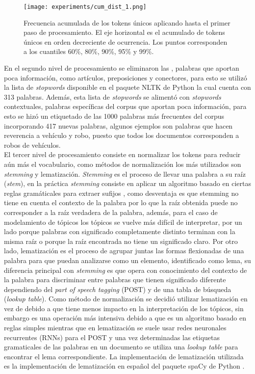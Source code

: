 \documentclass[letterpaper,12pt,oneside]{book} %
\begin{document}
\begin{figure}
    \centering
    \texttt{[image: experiments/cum\_dist\_1.png]}
    \caption{Frecuencia acumulada de los tokens únicos aplicando hasta el primer paso de procesamiento. El eje horizontal es el acumulado de tokens únicos en orden decreciente de ocurrencia. Los puntos corresponden a los cuantiles 60\%, 80\%, 90\%, 95\% y 99\%.}
    \label{img:cum_dist1}
\end{figure}

En el segundo nivel de procesamiento se eliminaron las , palabras que aportan poca información, como artículos, preposiciones y conectores, para esto se utilizó la lista de \textit{stopwords} disponible en el paquete NLTK de Python \citep{bird2009natural} la cual cuenta con 313 palabras. Además, esta lista de \textit{stopwords} se alimentó con \textit{stopwords} contextuales, palabras específicas del corpus que aportan poca información, para esto se hizó un etiquetado de las 1000 palabras más frecuentes del corpus incorporando 417 nuevas palabras, algunos ejemplos son palabras que hacen reverencia a vehículo y robo, puesto que todos los documentos corresponden a robos de vehículos.\\

El tercer nivel de procesamiento consiste en normalizar los tokens para reducir aún más el vocabulario, como métodos de normalización los más utilizados son \textit{stemming}  y lematización. \textit{Stemming} es el proceso de llevar una palabra a su raíz (\textit{stem}), en la práctica \textit{stemming} consiste en aplicar un algoritmo basado en ciertas reglas gramáticales para extraer sufijos \citep{porter1980algorithm}, como desventaja es que stemming no tiene en cuenta el contexto de la palabra por lo que la raíz obtenida puede no corresponder a la raíz verdadera de la palabra, además, para el caso de modelamiento de tópicos los tópicos se vuelve más difícil de interpretar, por un lado porque palabras con significado completamente distinto terminan con la misma raíz o porque la raíz encontrada no tiene un significado claro. Por otro lado, lematización es el proceso de agrupar juntas las formas flexionadas de una palabra para que puedan analizarse como un elemento, identificado como lema, su diferencia principal con \textit{stemming} es que opera con conocimiento del contexto de la palabra para discriminar entre palabras que tienen significado diferente dependiendo del \textit{part of speech tagging} (POST) y de una tabla de búsqueda (\textit{lookup table}). Como método de normalización se decidió utilizar lematización en vez de  debido a que tiene menos impacto en la interpretación de los tópicos, sin embargo es una operación más intensiva debido a que  es un algoritmo basado en reglas simples mientras que en lematización se suele usar redes neuronales recurrentes (RNNs) para el POST y una vez determinadas las etiquetas gramaticales de las palabras en un documento se utiliza una \textit{lookup table} para encontrar el lema correspondiente. La implementación de lematización utilizada es la implementación de lematización en español del paquete spaCy de Python \citep{spacy2}.\\
\end{document}

